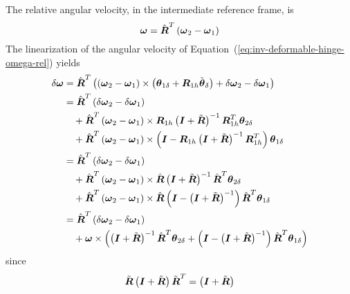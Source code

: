 \documentclass[10pt,dvips,fleqn]{report}
\newcommand{\T}[1]{\boldsymbol{#1}}
\begin{document}
The relative angular velocity, in the intermediate reference frame, is
\begin{equation}
	\T{\omega} = \hat{\T{R}}^T \plbr{\T{\omega}_2 - \T{\omega}_1}
	\label{eq:inv-deformable-hinge-omega-rel}
\end{equation}
The linearization of the angular velocity 
of Equation~(\ref{eq:inv-deformable-hinge-omega-rel}) yields
\begin{align}
	\delta\T{\omega}
	&= \hat{\T{R}}^T \plbr{
		\plbr{\T{\omega}_2 - \T{\omega}_1} \times \plbr{\T{\theta}_{1\delta} + \T{R}_{1h} \tilde{\T{\theta}}_{\delta}}
		+ \delta\T{\omega}_2 - \delta\T{\omega}_1
	} \\
	&= \hat{\T{R}}^T \plbr{
		\delta\T{\omega}_2 - \delta\T{\omega}_1
	} \nonumber \\
	& \mbox{\hspace{10pt}} + \hat{\T{R}}^T \plbr{\T{\omega}_2 - \T{\omega}_1} \times 
			\T{R}_{1h}\plbr{\T{I} + \tilde{\T{R}}}^{-1} \T{R}_{1h}^T \T{\theta}_{2\delta} \nonumber \\
	& \mbox{\hspace{10pt}} + \hat{\T{R}}^T \plbr{\T{\omega}_2 - \T{\omega}_1} \times
			\plbr{\T{I} - \T{R}_{1h}\plbr{\T{I} + \tilde{\T{R}}}^{-1} \T{R}_{1h}^T} \T{\theta}_{1\delta} \\
	&= \hat{\T{R}}^T \plbr{
		\delta\T{\omega}_2 - \delta\T{\omega}_1
	} \nonumber \\
	& \mbox{\hspace{10pt}} + \hat{\T{R}}^T \plbr{\T{\omega}_2 - \T{\omega}_1} \times 
			\hat{\T{R}}\plbr{\T{I} + \tilde{\T{R}}}^{-1} \hat{\T{R}}^T \T{\theta}_{2\delta} \nonumber \\
	& \mbox{\hspace{10pt}} + \hat{\T{R}}^T \plbr{\T{\omega}_2 - \T{\omega}_1} \times
			\hat{\T{R}}\plbr{\T{I} - \plbr{\T{I} + \tilde{\T{R}}}^{-1}} \hat{\T{R}}^T \T{\theta}_{1\delta} \\
	&= \hat{\T{R}}^T \plbr{
		\delta\T{\omega}_2 - \delta\T{\omega}_1
	} \nonumber \\
	& \mbox{\hspace{10pt}} + \T{\omega} \times \plbr{
		\plbr{\T{I} + \tilde{\T{R}}}^{-1} \hat{\T{R}}^T \T{\theta}_{2\delta}
		+ \plbr{\T{I} - \plbr{\T{I} + \tilde{\T{R}}}^{-1}} \hat{\T{R}}^T \T{\theta}_{1\delta}
	}
	\label{eq:inv-deformable-hinge-omega-rel-delta}
\end{align}
since
\begin{equation}
	\tilde{\T{R}}\plbr{\T{I} + \tilde{\T{R}}} \tilde{\T{R}}^T = \plbr{\T{I} + \tilde{\T{R}}}
\end{equation}
\end{document}
